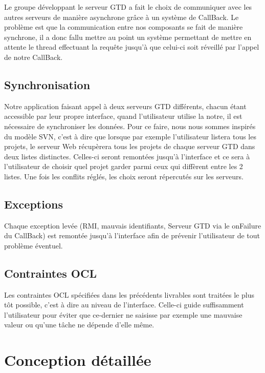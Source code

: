     Le groupe développant le serveur GTD a fait le choix de communiquer avec les autres serveurs de manière asynchrone grâce à un système de CallBack. Le problème est que la communication entre nos composants se fait de manière synchrone, il a donc fallu mettre au point un système permettant de mettre en attente le thread effectuant la requête jusqu'à que celui-ci soit réveillé par l'appel de notre CallBack.

    \section{Synchronisation}

    Notre application faisant appel à deux serveurs GTD différents, chacun étant accessible par leur propre interface, quand l'utilisateur utilise la notre, il est nécessaire de synchroniser les données. Pour ce faire, nous nous sommes inspirés du modèle SVN, c'est à dire que lorsque par exemple l'utilisateur listera tous les projets, le serveur Web récupèrera tous les projets de chaque serveur GTD dans deux listes distinctes. Celles-ci seront remontées jusqu'à l'interface et ce sera à l'utilisateur de choisir quel projet garder parmi ceux qui diffèrent entre les 2 listes. Une fois les conflits réglés, les choix seront répercutés sur les serveurs.

    \section{Exceptions}
    
    Chaque exception levée (RMI, mauvais identifiants, Serveur GTD via le onFailure du CallBack) est remontée jusqu'à l'interface afin de prévenir l'utilisateur de tout problème éventuel.

    \section{Contraintes OCL}

    Les contraintes OCL spécifiées dans les précédents livrables sont traitées le plus tôt possible, c'est à dire au niveau de l'interface. Celle-ci guide suffisamment l'utilisateur pour éviter que ce-dernier ne saisisse par exemple une mauvaise valeur ou qu'une tâche ne dépende d'elle même.


\chapter{Conception détaillée}

